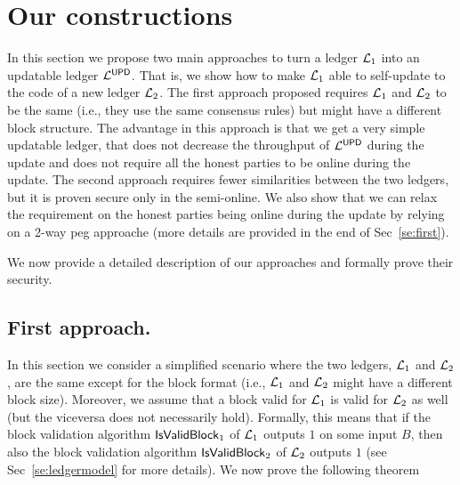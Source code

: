 \section{Our constructions}
In this section we propose two main approaches to turn a ledger $\mathcal{L}_1$ into an updatable ledger $\mathcal{L}^\mathsf{UPD}$. That is, we show how to make $\mathcal{L}_1$ able to self-update to the code of a new ledger $\mathcal{L}_2$.
The first approach proposed requires $\mathcal{L}_1$ and $\mathcal{L}_2$ to be the same (i.e.,  they use the same consensus rules) but might have a different block structure. The advantage in this approach is that we get a very simple updatable ledger, that does not decrease the throughput of  $\mathcal{L}^\mathsf{UPD}$ during the update and does not require all the honest parties to be online during the update. 
The second approach requires fewer similarities between the two ledgers, but it is proven secure only in the semi-online. We also show that we can relax the requirement on the honest parties being online during the update by relying on a 2-way peg approache (more details are provided in the end of Sec~\ref{se:first}).

We now provide a detailed description of our approaches and formally prove their security.




\subsection{First approach.}
In this section we consider a simplified scenario where the two ledgers, $\mathcal{L}_1$ and $\mathcal{L}_2$, 
are the same except for the block format (i.e., $\mathcal{L}_1$ and $\mathcal{L}_2$ might have a different block size).
Moreover, we assume that a block valid for $\mathcal{L}_1$ is valid for $\mathcal{L}_2$ as well (but the viceversa does not necessarily hold). Formally, this means that if the block validation algorithm  $\mathsf{IsValidBlock}_1$ of $\mathcal{L}_1$
outputs $1$ on some input $B$, then also the block validation algorithm $\mathsf{IsValidBlock}_2$ of $\mathcal{L}_2$ outputs $1$ (see Sec~\ref{se:ledgermodel} for more details).
We now prove the following theorem


